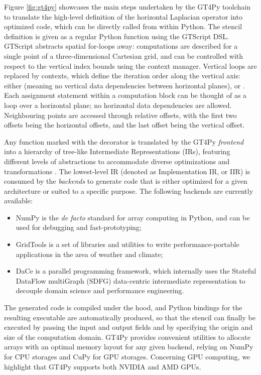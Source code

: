 \documentclass[main.tex]{subfiles}
\begin{document}
        Figure \ref{fig:gt4py} showcases the main steps undertaken by the GT4Py toolchain to translate the high-level definition of the horizontal Laplacian operator into optimized code, which can be directly called from within Python. The stencil definition is given as a regular Python function using the GTScript DSL. GTScript abstracts spatial for-loops away: computations are described for a single point of a three-dimensional Cartesian grid, and can be controlled with respect to the vertical index bounds using the  context manager. Vertical loops are replaced by  contexts, which define the iteration order along the vertical axis: either  (meaning no vertical data dependencies between horizontal planes),  or . Each assignment statement within a computation block can be thought of as a loop over a horizontal plane; no horizontal data dependencies are allowed. Neighbouring points are accessed through relative offsets, with the first two offsets being the horizontal offsets, and the last offset being the vertical offset.

        Any function marked with the  decorator is translated by the GT4Py \emph{frontend} into a hierarchy of tree-like Intermediate Representations (IRs), featuring different levels of abstractions to accommodate diverse optimizations and transformations \citep{gysi21}. The lowest-level IR (denoted as Implementation IR, or IIR) is consumed by the \emph{backends} to generate code that is either optimized for a given architecture or suited to a specific purpose. The following backends are currently available:
        \begin{itemize}
            \item NumPy \citep{harris20} is the \emph{de facto} standard for array computing in Python, and can be used for debugging and fast-prototyping;
            \item GridTools \citep{afanasyev21} is a set of libraries and utilities to write performance-portable applications in the area of weather and climate;
            \item DaCe \citep{ben-nun19} is a parallel programming framework, which internally uses the Stateful DataFlow multiGraph (SDFG) data-centric intermediate representation to decouple domain science and performance engineering.
        \end{itemize}
        The generated code is compiled under the hood, and Python bindings for the resulting executable are automatically produced, so that the stencil can finally be executed by passing the input and output fields and by specifying the origin and size of the computation domain. GT4Py provides convenient utilities to allocate arrays with an optimal memory layout for any given backend, relying on NumPy for CPU storages and CuPy \citep{nishino17} for GPU storages. Concerning GPU computing, we highlight that GT4Py supports both NVIDIA and AMD GPUs.
\end{document}

